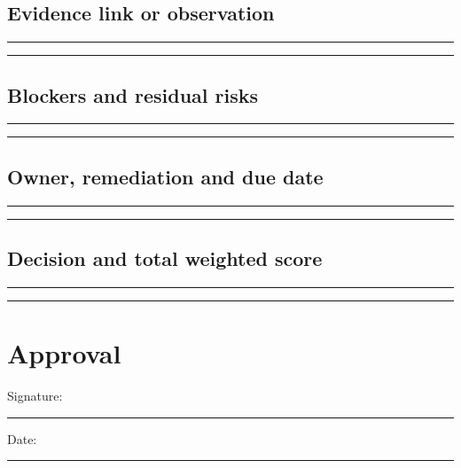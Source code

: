\documentclass[11pt]{article}
\begin{document}
\subsection{Evidence link or observation}
\noindent\rule{\linewidth}{0.4pt}\par\vspace{0.3in}\noindent\rule{\linewidth}{0.4pt}\par\vspace{0.4in}

\subsection{Blockers and residual risks}
\noindent\rule{\linewidth}{0.4pt}\par\vspace{0.3in}\noindent\rule{\linewidth}{0.4pt}\par\vspace{0.4in}

\subsection{Owner, remediation and due date}
\noindent\rule{\linewidth}{0.4pt}\par\vspace{0.3in}\noindent\rule{\linewidth}{0.4pt}\par\vspace{0.4in}

\subsection{Decision and total weighted score}
\noindent\rule{\linewidth}{0.4pt}\par\vspace{0.3in}\noindent\rule{\linewidth}{0.4pt}\par\vspace{0.4in}

\section{Approval}
Signature: \rule{0.55\linewidth}{0.4pt}\hfill Date: \rule{0.16\linewidth}{0.4pt}\par
\end{document}
